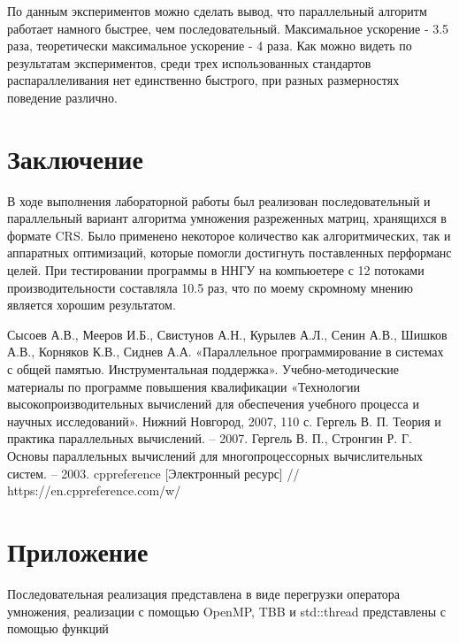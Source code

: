 \documentclass{report}
\begin{document}
\par По данным экспериментов можно сделать вывод, что параллельный алгоритм работает намного быстрее, чем последовательный. Максимальное ускорение - 3.5 раза, теоретически максимальное ускорение - 4 раза. Как можно видеть по результатам экспериментов, среди трех использованных стандартов распараллеливания нет единственно быстрого, при разных размерностях поведение различно.
\newpage

\section*{Заключение}
В ходе выполнения лабораторной работы был реализован последовательный и параллельный вариант алгоритма умножения разреженных матриц, хранящихся в формате CRS. Было применено некоторое количество как алгоритмических, так и аппаратных оптимизаций, которые помогли достигнуть поставленных перформанс целей. При тестировании программы в ННГУ на компьюетере с 12 потоками производительности составляла 10.5 раз, что по моему скромному мнению является хорошим результатом.

\newpage

\begin{thebibliography}{1}
 Сысоев А.В., Мееров И.Б., Свистунов А.Н., Курылев А.Л., Сенин А.В., Шишков А.В., Корняков К.В., Сиднев А.А. «Параллельное программирование в системах с общей памятью. Инструментальная поддержка». Учебно-методические материалы по программе повышения квалификации «Технологии высокопроизводительных вычислений для обеспечения учебного процесса и научных исследований». Нижний Новгород, 2007, 110 с. 
Гергель В. П. Теория и практика параллельных вычислений. – 2007. 
Гергель В. П., Стронгин Р. Г. Основы параллельных вычислений для многопроцессорных вычислительных систем. – 2003.
 cppreference [Электронный ресурс] // https://en.cppreference.com/w/
\end{thebibliography}

\newpage

\section*{Приложение}

\par Последовательная реализация представлена в виде перегрузки оператора умножения, реализации с помощью OpenMP, TBB и std::thread представлены с помощью функций 
\end{document}
